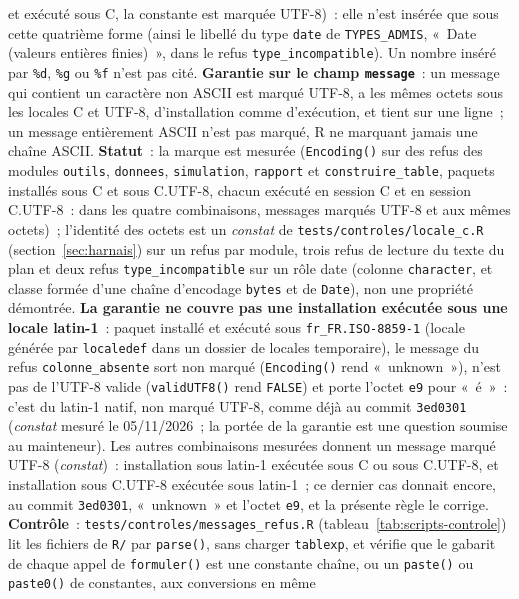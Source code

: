 \documentclass[a4paper,11pt]{article}
\newcommand{\code}[1]{\texttt{\small #1}}
\begin{document}
et exécuté sous C, la constante est marquée UTF-8)~: elle n'est insérée
que sous cette quatrième forme (ainsi le libellé du type \code{date} de \code{TYPES\_ADMIS},
«~Date (valeurs entières finies)~», dans le refus
\code{type\_incompatible}).
Un nombre inséré par
\code{\%d}, \code{\%g} ou \code{\%f} n'est pas cité.
\textbf{Garantie sur le champ \code{message}}~: un message qui contient un
caractère non ASCII est marqué UTF-8, a les mêmes octets sous les locales
C et UTF-8, d'installation comme d'exécution, et tient sur une ligne~; un
message entièrement ASCII n'est pas marqué, R ne marquant jamais une
chaîne ASCII. \textbf{Statut}~: la marque est mesurée (\code{Encoding()}
sur des refus des modules \code{outils}, \code{donnees},
\code{simulation}, \code{rapport} et \code{construire\_table}, paquets
installés sous C et sous C.UTF-8, chacun exécuté en session C et en
session C.UTF-8~: dans les quatre combinaisons, messages marqués UTF-8 et
aux mêmes octets)~; l'identité des octets est
un \emph{constat} de \code{tests/controles/locale\_c.R}
(section~\ref{sec:harnais}) sur un refus par module, trois refus de
lecture du texte du plan et deux refus \code{type\_incompatible} sur un
rôle date (colonne \code{character}, et classe formée d'une chaîne
d'encodage \code{bytes} et de \code{Date}), non une propriété
démontrée. \textbf{La garantie
ne couvre pas une installation exécutée sous une locale latin-1}~: paquet
installé et exécuté sous \code{fr\_FR.ISO-8859-1} (locale générée par
\code{localedef} dans un dossier de locales temporaire), le message du
refus \code{colonne\_absente} sort non marqué (\code{Encoding()} rend
«~unknown~»), n'est pas de l'UTF-8 valide (\code{validUTF8()} rend
\code{FALSE}) et porte l'octet \code{e9} pour «~é~»~: c'est du latin-1
natif, non marqué UTF-8, comme déjà au commit \code{3ed0301}
(\emph{constat} mesuré le 05/11/2026~; la portée de la garantie est une
question soumise au mainteneur). Les autres combinaisons mesurées donnent
un message marqué UTF-8 (\emph{constat})~: installation sous latin-1
exécutée sous C ou sous C.UTF-8, et installation sous C.UTF-8 exécutée
sous latin-1~; ce dernier cas donnait encore, au commit \code{3ed0301},
«~unknown~» et l'octet \code{e9}, et la présente règle le corrige.
\textbf{Contrôle}~: \code{tests/controles/messages\_refus.R}
(tableau~\ref{tab:scripts-controle}) lit les fichiers de \code{R/} par
\code{parse()}, sans charger \code{tablexp}, et vérifie que le gabarit de
chaque appel de \code{formuler()} est une constante chaîne, ou un
\code{paste()} ou \code{paste0()} de constantes, aux conversions en même
\end{document}

